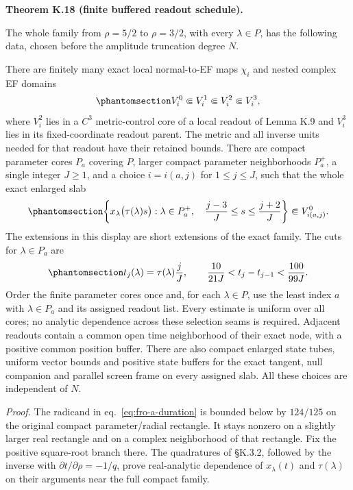 \documentclass[
  english,
  11pt,
  reqno]{amsart}
\makeatletter
\newcommand{\pandocstatementheading}[1]{%
  \par\addpenalty{\@beginparpenalty}%
  \addvspace{.5\baselineskip plus .2\baselineskip minus .2\baselineskip}%
  {\normalfont\bfseries #1\par}%
  \nobreak\@afterindenttrue\@afterheading
}
\makeatother
\begin{document}
\pandocstatementheading{\protect{}\label{thm:fro-a-finite-domain-schedule}Theorem K.18 (finite buffered readout schedule).}

The whole family from \(\rho=5/2\) to \(\rho=3/2\), with every
\(\lambda\in P\), has the following data, chosen before the amplitude
truncation degree \(N\).

There are finitely many exact local normal-to-EF maps \(\chi_i\) and
nested complex EF domains
\begin{equation}\protect\phantomsection\label{eq:fro-a-nested-domains}{
 V_i^0\Subset V_i^1\Subset V_i^2\Subset V_i^3,
}\end{equation} where \(V_i^2\) lies in a \(C^3\) metric-control core of
a local readout of Lemma K.9 and \(V_i^3\) lies in its fixed-coordinate
readout parent. The metric and all inverse units needed for that readout
have their retained bounds. There are compact parameter cores \(P_a\)
covering \(P\), larger compact parameter neighborhoods \(P_a^+\), a
single integer \(J\ge1\), and a choice \(i=i(a,j)\) for \(1\le j\le J\),
such that the whole exact enlarged slab
\begin{equation}\protect\phantomsection\label{eq:fro-a-enlarged-slab}{
 \left\{
  x_\lambda\bigl(\tau(\lambda)s\bigr):
   \lambda\in P_a^+,\quad
   \frac{j-3}{J}\le s\le\frac{j+2}{J}
 \right\}
 \Subset V_{i(a,j)}^0 .
}\end{equation} The extensions in this display are short extensions of
the exact family. The cuts for \(\lambda\in P_a\) are
\begin{equation}\protect\phantomsection\label{eq:fro-a-affine-cuts}{
 t_j(\lambda)=\tau(\lambda)\frac jJ,\qquad
 \frac{10}{21J}<t_j-t_{j-1}<\frac{100}{99J}.
}\end{equation} Order the finite parameter cores once and, for each
\(\lambda\in P\), use the least index \(a\) with \(\lambda\in P_a\) and
its assigned readout list. Every estimate is uniform over all cores; no
analytic dependence across these selection seams is required. Adjacent
readouts contain a common open time neighborhood of their exact node,
with a positive common position buffer. There are also compact enlarged
state tubes, uniform vector bounds and positive state buffers for the
exact tangent, null companion and parallel screen frame on every
assigned slab. All these choices are independent of \(N\).

\emph{Proof.} The radicand in eq.~\ref{eq:fro-a-duration} is bounded
below by \(124/125\) on the original compact parameter/radial rectangle.
It stays nonzero on a slightly larger real rectangle and on a complex
neighborhood of that rectangle. Fix the positive square-root branch
there. The quadratures of §K.3.2, followed by the inverse with
\(\partial t/\partial\rho=-1/q\), prove real-analytic dependence of
\(x_\lambda(t)\) and \(\tau(\lambda)\) on their arguments near the full
compact family.
\end{document}
